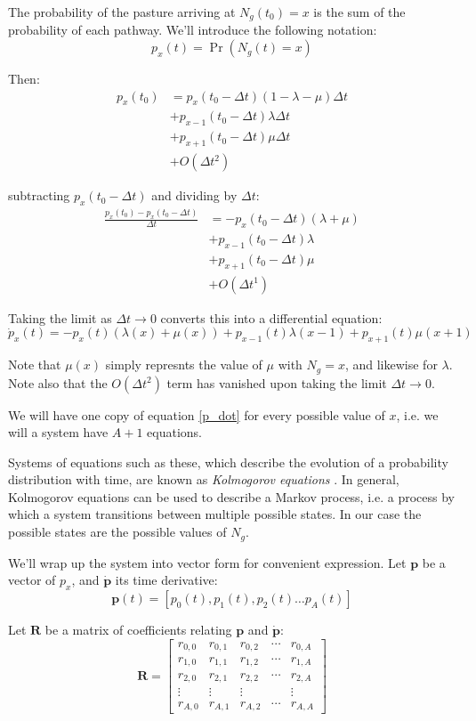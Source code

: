 \documentclass{article}
\theoremstyle{theorem}
\theoremstyle{definition}
\begin{document}
The probability of the pasture arriving at $N_g(t_0)=x$ is the sum of the probability of each pathway. We'll introduce the following notation:
$$p_x(t)=\Pr(N_g(t)=x)$$

Then:
\begin{align*}
    p_x(t_0)&=p_x(t_0-\Delta t)(1-\lambda-\mu)\Delta t\\
    &+p_{x-1}(t_0-\Delta t)\lambda\Delta t\\
    &+p_{x+1}(t_0-\Delta t)\mu\Delta t\\
    &+O(\Delta t^2)
\end{align*}

subtracting $p_x(t_0-\Delta t)$ and dividing by $\Delta t$:
\begin{align*}
    \frac{p_x(t_0)-p_x(t_0-\Delta t)}{\Delta t}&=-p_x(t_0-\Delta t)(\lambda+\mu)\\
    &+p_{x-1}(t_0-\Delta t)\lambda\\
    &+p_{x+1}(t_0-\Delta t)\mu\\
    &+O(\Delta t^1)
\end{align*}

Taking the limit as $\Delta t\rightarrow 0$ converts this into a differential equation:
\begin{equation}
    \label{p_dot}
    \dot{p}_x(t)=-p_x(t)(\lambda(x)+\mu(x))+p_{x-1}(t)\lambda(x-1)+p_{x+1}(t)\mu(x+1)
\end{equation}

Note that $\mu(x)$ simply represnts the value of $\mu$ with $N_g=x$, and likewise for $\lambda$. Note also that the $O(\Delta t^2)$ term has vanished upon taking the limit $\Delta t\rightarrow 0$.

We will have one copy of equation \ref{p_dot} for every possible value of $x$, i.e. we will a system have $A+1$ equations.

Systems of equations such as these, which describe the evolution of a probability distribution with time, are known as \textit{Kolmogorov equations} \cite{matis_kiffe}. In general, Kolmogorov equations can be used to describe a Markov process, i.e. a process by which a system transitions between multiple possible states. In our case the possible states are the possible values of $N_g$.

We'll wrap up the system into vector form for convenient expression. Let $\mathbf{p}$ be a vector of $p_x$, and $\dot{\mathbf{p}}$ its time derivative:
$$\mathbf{p}(t)=[p_0(t), p_1(t), p_2(t) \dots p_A(t)]$$

Let $\mathbf{R}$ be a matrix of coefficients relating $\mathbf{p}$ and $\dot{\mathbf{p}}$:
$$\mathbf{R}=
\begin{bmatrix}
    r_{0,0} & r_{0,1} & r_{0,2} & \cdots & r_{0,A}\\
    r_{1,0} & r_{1,1} & r_{1,2} & \cdots & r_{1,A}\\
    r_{2,0} & r_{2,1} & r_{2,2} & \cdots & r_{2,A}\\
    \vdots & \vdots & \vdots & & \vdots\\
    r_{A,0} & r_{A,1} & r_{A,2} & \cdots & r_{A,A}
\end{bmatrix}$$
\end{document}
